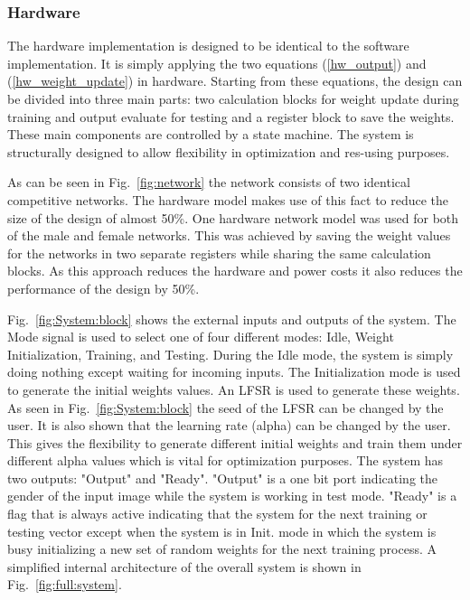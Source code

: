 \documentclass[10pt,journal]{IEEEtran}
\newcommand{\fig}[1]{Fig.~\ref{#1}}
\newcommand{\eq}[1]{(\ref{#1})}
\begin{document}
		\subsubsection{Hardware}
The hardware implementation is designed to be identical to the software implementation. It is simply applying the two equations \eq{hw_output} and \eq{hw_weight_update} in hardware. Starting from these equations, the design can be divided into three main parts: two calculation blocks for weight update during training and output evaluate for testing and a register block to save the weights. These main components are controlled by a state machine. The system is structurally designed to allow flexibility in optimization and res-using purposes.  

As can be seen in \fig{fig:network} the network consists of two identical competitive networks. The hardware model makes use of this fact to reduce the size of the design of almost 50\%. One hardware network model was used for both of the male and female networks. This was achieved by saving the weight values for the networks in two separate registers while sharing the same calculation blocks. As this approach reduces the hardware and power costs it also reduces the performance of the design by 50\%. 

\fig{fig:System:block} shows the external inputs and outputs of the system. The Mode signal is used to select one of four different modes: Idle, Weight Initialization, Training, and Testing. During the Idle mode, the system is simply doing nothing except waiting for incoming inputs. The Initialization mode is used to generate the initial weights values. An LFSR is used to generate these weights. As seen in \fig{fig:System:block} the seed of the LFSR can be changed by the user. It is also shown that the learning rate (alpha) can be changed by the user. This gives the flexibility to generate different initial weights and train them under different alpha values which is vital for optimization purposes. The system has two outputs: "Output" and "Ready". "Output" is a one bit port indicating the gender of the input image while the system is working in test mode. "Ready" is a flag that is always active indicating that the system for the next training or testing vector except when the system is in Init. mode in which the system is busy initializing a new set of random weights for the next training process. A simplified internal architecture of the overall system is shown in \fig{fig:full:system}. 
\end{document}
